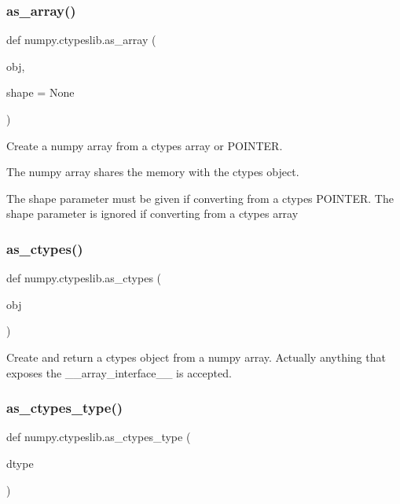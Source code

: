 \subsubsection{\texorpdfstring{as\+\_\+array()}{as\_array()}}
{\footnotesize\ttfamily def numpy.\+ctypeslib.\+as\+\_\+array (\begin{DoxyParamCaption}\item[{}]{obj,  }\item[{}]{shape = {\ttfamily None} }\end{DoxyParamCaption})}

\begin{DoxyVerb}Create a numpy array from a ctypes array or POINTER.

The numpy array shares the memory with the ctypes object.

The shape parameter must be given if converting from a ctypes POINTER.
The shape parameter is ignored if converting from a ctypes array
\end{DoxyVerb}
 \mbox{\label{namespacenumpy_1_1ctypeslib_a231716ff579fb72c032e317a5e4eae06}} 
\subsubsection{\texorpdfstring{as\+\_\+ctypes()}{as\_ctypes()}}
{\footnotesize\ttfamily def numpy.\+ctypeslib.\+as\+\_\+ctypes (\begin{DoxyParamCaption}\item[{}]{obj }\end{DoxyParamCaption})}

\begin{DoxyVerb}Create and return a ctypes object from a numpy array.  Actually
anything that exposes the __array_interface__ is accepted.\end{DoxyVerb}
 \mbox{\label{namespacenumpy_1_1ctypeslib_ab7c52e800950b05eaf233b42439899fa}} 
\subsubsection{\texorpdfstring{as\+\_\+ctypes\+\_\+type()}{as\_ctypes\_type()}}
{\footnotesize\ttfamily def numpy.\+ctypeslib.\+as\+\_\+ctypes\+\_\+type (\begin{DoxyParamCaption}\item[{}]{dtype }\end{DoxyParamCaption})}

